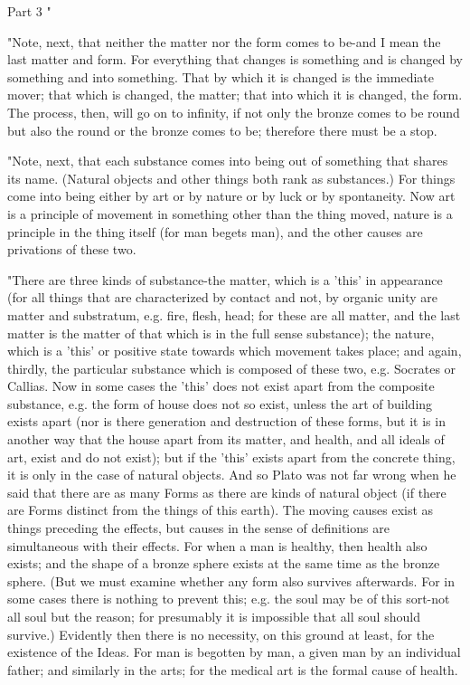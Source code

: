 Part 3 "

"Note, next, that neither the matter nor the form comes to be-and
I mean the last matter and form. For everything that changes is something
and is changed by something and into something. That by which it is
changed is the immediate mover; that which is changed, the matter;
that into which it is changed, the form. The process, then, will go
on to infinity, if not only the bronze comes to be round but also
the round or the bronze comes to be; therefore there must be a stop.

"Note, next, that each substance comes into being out of something
that shares its name. (Natural objects and other things both rank
as substances.) For things come into being either by art or by nature
or by luck or by spontaneity. Now art is a principle of movement in
something other than the thing moved, nature is a principle in the
thing itself (for man begets man), and the other causes are privations
of these two. 

"There are three kinds of substance-the matter, which is a 'this'
in appearance (for all things that are characterized by contact and
not, by organic unity are matter and substratum, e.g. fire, flesh,
head; for these are all matter, and the last matter is the matter
of that which is in the full sense substance); the nature, which is
a 'this' or positive state towards which movement takes place; and
again, thirdly, the particular substance which is composed of these
two, e.g. Socrates or Callias. Now in some cases the 'this' does not
exist apart from the composite substance, e.g. the form of house does
not so exist, unless the art of building exists apart (nor is there
generation and destruction of these forms, but it is in another way
that the house apart from its matter, and health, and all ideals of
art, exist and do not exist); but if the 'this' exists apart from
the concrete thing, it is only in the case of natural objects. And
so Plato was not far wrong when he said that there are as many Forms
as there are kinds of natural object (if there are Forms distinct
from the things of this earth). The moving causes exist as things
preceding the effects, but causes in the sense of definitions are
simultaneous with their effects. For when a man is healthy, then health
also exists; and the shape of a bronze sphere exists at the same time
as the bronze sphere. (But we must examine whether any form also survives
afterwards. For in some cases there is nothing to prevent this; e.g.
the soul may be of this sort-not all soul but the reason; for presumably
it is impossible that all soul should survive.) Evidently then there
is no necessity, on this ground at least, for the existence of the
Ideas. For man is begotten by man, a given man by an individual father;
and similarly in the arts; for the medical art is the formal cause
of health. 

